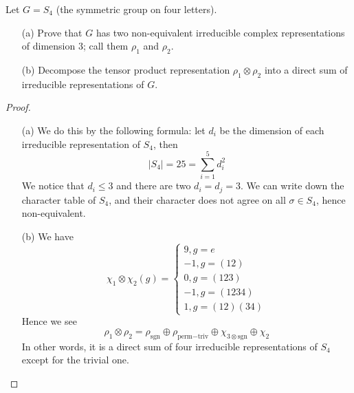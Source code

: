 \begin{prob}[F2015-Q3]
    Let \( G = S_4 \) (the symmetric group on four letters).

\begin{enumerate}
    \item[(a)] Prove that \( G \) has two non-equivalent irreducible complex representations of dimension 3; call them \( \rho_1 \) and \( \rho_2 \).
    
    \item[(b)] Decompose the tensor product representation \( \rho_1 \otimes \rho_2 \) into a direct sum of irreducible representations of \( G \).
\end{enumerate}
\end{prob}
\begin{proof}
    \begin{itemize}
        \item[(a)] We do this by the following formula: let $d_i$ be the dimension of each irreducible representation of $S_4$, then 
        \begin{equation*}
            |S_4|=25=\sum_{i=1}^5d_i^2
        \end{equation*}
        We notice that $d_i\leq 3$ and there are two $d_i=d_j=3$. We can write down the character table of $S_4$, and their character does not agree on all $\sigma\in S_4$, hence non-equivalent.
        \item[(b)] We have 
        \begin{equation*}
            \chi_1\otimes\chi_2(g)=\begin{cases}
                9, g=e\\
                -1, g=(12)\\
                0, g=(123)\\
                -1, g=(1234)\\
                1, g=(12)(34)
            \end{cases}
        \end{equation*}
        Hence we see 
        \begin{equation*}
            \rho_1\otimes\rho_2=\rho_{\text{sgn}}\oplus\rho_{\text{perm}-\text{triv}}\oplus\chi_{3\otimes\text{sgn}}\oplus\chi_{2}
        \end{equation*}
        In other words, it is a direct sum of four irreducible representations of $S_4$ except for the trivial one.
    \end{itemize}
\end{proof}



